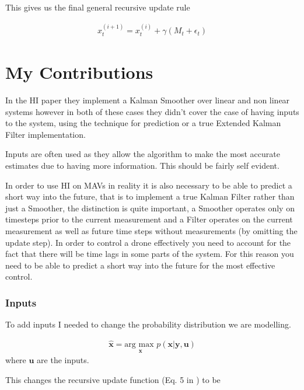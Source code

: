 \documentclass[]{../resources/final_report}
\begin{document}
This gives us the final general recursive update rule

\begin{align}
  x_t^{(i+1)} = x_t^{(i)} + \gamma (M_t + \epsilon_t)
\end{align}


\section{My Contributions}


In the HI paper they implement a Kalman Smoother over linear and non linear systems however in both of these cases they didn't cover the case of having inputs to the system,  using the technique for prediction or a true Extended Kalman Filter implementation.

Inputs are often used as they allow the algorithm to make the most accurate estimates due to having more information. This should be fairly self evident.

In order to use HI on MAVs in reality it is also necessary to be able to predict a short way into the future, that is to implement a true Kalman Filter rather than just a Smoother, the distinction is quite important, a Smoother operates only on timesteps prior to the current measurement and a Filter operates on the current measurement as well as future time steps without measurements (by omitting the update step). In order to control a drone effectively you need to account for the fact that there will be time lags in some parts of the system. For this reason you need to be able to predict a short way into the future for the most effective control.


\subsubsection{Inputs}

To add inputs I needed to change the probability distribution we are modelling.

\begin{align}
  \hat{\textbf{x}} = \underset{\textbf{x}}{\text{arg max }} p(\textbf{x} | \textbf{y}, \textbf{u}) 
\end{align}
where $\textbf{u}$ are the inputs.

This changes the recursive update function (Eq. 5 in \cite{Satorras2019CombiningGA}) to be 
\end{document}
